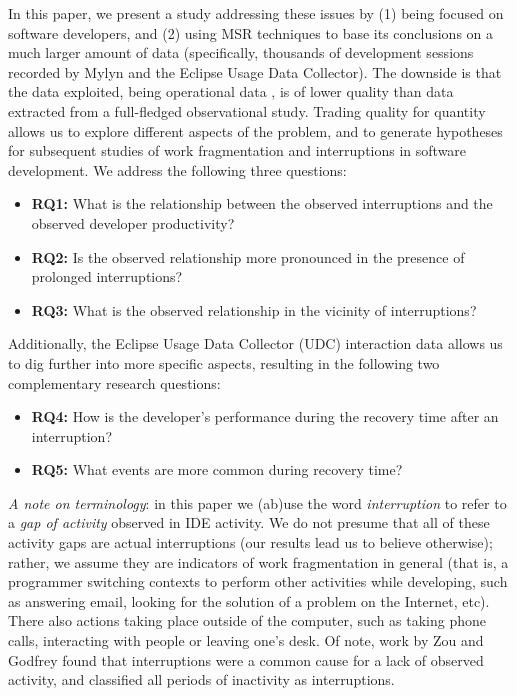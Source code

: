 \documentclass[times]{smrauth}
\begin{document}
In this paper, we present a study addressing these issues by (1) being focused on software developers, and (2) using MSR techniques to base its conclusions on a much larger amount of data (specifically, thousands of development sessions recorded by Mylyn and the Eclipse Usage Data Collector). The downside is that the data exploited, being operational data \cite{M14}, is of lower quality than data extracted from a full-fledged observational study. Trading quality for quantity allows us to explore different aspects of the problem, and to generate hypotheses for subsequent studies of work fragmentation and interruptions in software development. We address the following three questions:
\begin{itemize}
\item \textbf{RQ1:} What is the relationship between the observed interruptions and the observed developer productivity? 
\item \textbf{RQ2:} Is the observed relationship more pronounced in the presence of prolonged interruptions?
\item \textbf{RQ3:}  What is the observed relationship in the vicinity of interruptions?
\end{itemize}

Additionally, the Eclipse Usage Data Collector (UDC) interaction data allows us to dig further into more specific aspects, resulting in the following two complementary research questions:
\begin{itemize}
\item \textbf{RQ4:} How is the developer's performance during the recovery time after an interruption? 
\item \textbf{RQ5:} What events are more common during recovery time?
\end{itemize}

\emph{A note on terminology}: in this paper we (ab)use the word \emph{interruption} to refer to a \emph{gap of activity} observed in IDE activity. We do not presume that all of these activity gaps are actual interruptions (our results lead us to believe otherwise); rather, we assume they are indicators of work fragmentation in general (that is, a programmer switching contexts to perform other activities while developing, such as answering email, looking for the solution of a problem on the Internet, etc). 
There also actions taking place outside of the computer, such as taking phone calls, interacting with people or leaving one's desk. 
Of note, work by Zou and Godfrey \cite{ZG06} found that interruptions were a common cause for a lack of observed activity, and classified all periods of inactivity as interruptions. %
\end{document}
